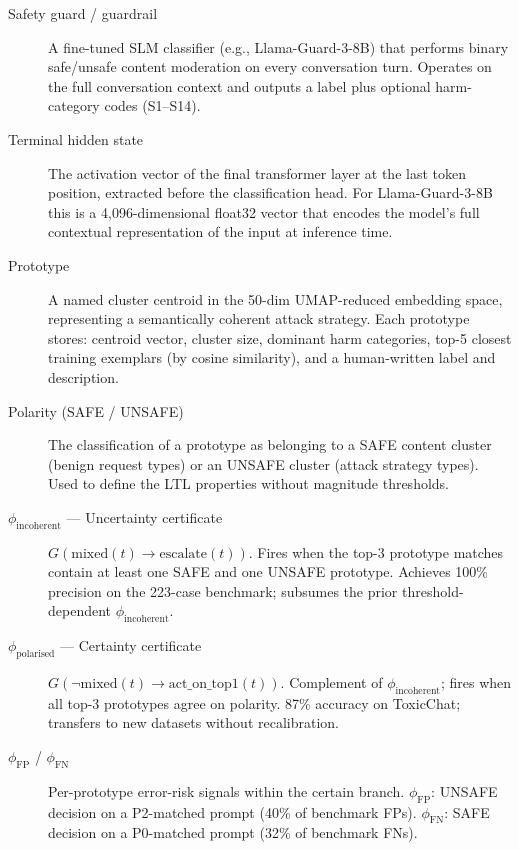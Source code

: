 \begin{description}

\item[Safety guard / guardrail]
A fine-tuned SLM classifier (e.g., Llama-Guard-3-8B) that performs binary
safe/unsafe content moderation on every conversation turn. Operates on the full
conversation context and outputs a label plus optional harm-category codes (S1--S14).

\item[Terminal hidden state]
The activation vector of the final transformer layer at the last token position,
extracted before the classification head. For Llama-Guard-3-8B this is a
4,096-dimensional float32 vector that encodes the model's full contextual
representation of the input at inference time.

\item[Prototype]
A named cluster centroid in the 50-dim UMAP-reduced embedding space, representing
a semantically coherent attack strategy. Each prototype stores: centroid vector,
cluster size, dominant harm categories, top-5 closest training exemplars (by cosine
similarity), and a human-written label and description.

\item[Polarity (SAFE / UNSAFE)]
The classification of a prototype as belonging to a SAFE content cluster (benign
request types) or an UNSAFE cluster (attack strategy types). Used to define the
LTL properties without magnitude thresholds.

\item[$\phi_\text{incoherent}$ --- Uncertainty certificate]
$G(\text{mixed}(t) \to \text{escalate}(t))$. Fires when the top-3 prototype
matches contain at least one SAFE and one UNSAFE prototype. Achieves 100\%
precision on the 223-case benchmark; subsumes the prior threshold-dependent
$\phi_\text{incoherent}$.

\item[$\phi_\text{polarised}$ --- Certainty certificate]
$G(\lnot\text{mixed}(t) \to \text{act\_on\_top1}(t))$. Complement of
$\phi_\text{incoherent}$; fires when all top-3 prototypes agree on polarity.
87\% accuracy on ToxicChat; transfers to new datasets without recalibration.

\item[$\phi_\text{FP}$ / $\phi_\text{FN}$]
Per-prototype error-risk signals within the certain branch.
$\phi_\text{FP}$: UNSAFE decision on a P2-matched prompt (40\% of benchmark FPs).
$\phi_\text{FN}$: SAFE decision on a P0-matched prompt (32\% of benchmark FNs).


\end{description}
